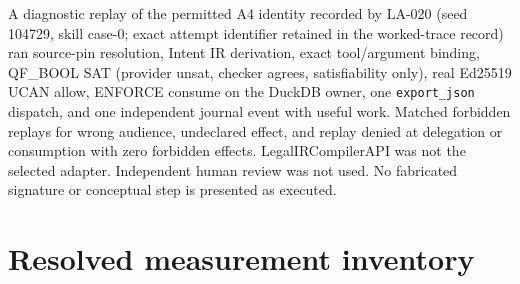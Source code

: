 \documentclass{article}
\begin{document}
A diagnostic replay of the permitted A4 identity recorded by LA-020 (seed 104729, skill case-0; exact attempt identifier retained in the worked-trace record) ran source-pin resolution, Intent IR derivation, exact tool/argument binding, QF\_BOOL SAT (provider unsat, checker agrees, satisfiability only), real Ed25519 UCAN allow, ENFORCE consume on the DuckDB owner, one \texttt{export\_json} dispatch, and one independent journal event with useful work. Matched forbidden replays for wrong audience, undeclared effect, and replay denied at delegation or consumption with zero forbidden effects. LegalIRCompilerAPI was not the selected adapter. Independent human review was not used. No fabricated signature or conceptual step is presented as executed.

\section{Resolved measurement inventory}
\end{document}
